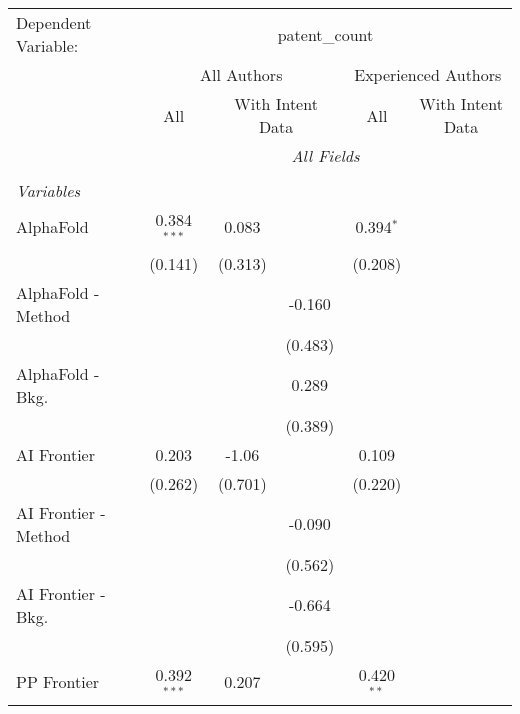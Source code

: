 \begingroup
\centering
\begin{tabular}{lcccccc}
   \tabularnewline \midrule \midrule
   Dependent Variable: & \multicolumn{6}{c}{patent\_count}\\
 & \multicolumn{3}{c}{All Authors} & \multicolumn{3}{c}{Experienced Authors} \\
\cmidrule(lr){2-4} \cmidrule(lr){5-7}
 & \multicolumn{1}{c}{All} & \multicolumn{2}{c}{With Intent Data} & \multicolumn{1}{c}{All} & \multicolumn{2}{c}{With Intent Data} \\
\cmidrule(lr){2-2} \cmidrule(lr){3-4} \cmidrule(lr){5-5} \cmidrule(lr){6-7}
 & \multicolumn{6}{c}{\textit{All Fields}} \\ \\
   \emph{Variables}\\
   AlphaFold            & 0.384$^{***}$ & 0.083        &         & 0.394$^{*}$  &        &   \\   
                        & (0.141)       & (0.313)      &         & (0.208)      &        &   \\   
   AlphaFold - Method   &               &              & -0.160  &              &        &   \\   
                        &               &              & (0.483) &              &        &   \\   
   AlphaFold - Bkg.     &               &              & 0.289   &              &        &   \\   
                        &               &              & (0.389) &              &        &   \\   
   AI Frontier          & 0.203         & -1.06        &         & 0.109        &        &   \\   
                        & (0.262)       & (0.701)      &         & (0.220)      &        &   \\   
   AI Frontier - Method &               &              & -0.090  &              &        &   \\   
                        &               &              & (0.562) &              &        &   \\   
   AI Frontier - Bkg.   &               &              & -0.664  &              &        &   \\   
                        &               &              & (0.595) &              &        &   \\   
   PP Frontier          & 0.392$^{***}$ & 0.207        &         & 0.420$^{**}$ &        &   \\   

\end{tabular}
